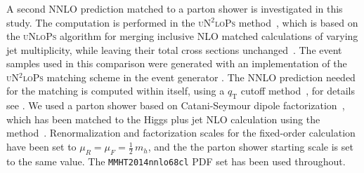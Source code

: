 \subsubsection{\hjetscompSherpa \hjetscompNNLOPS}
\label{sec:hjetscomp:tools:nnlops:sherpa}

A second NNLO prediction matched to a parton shower is investigated 
in this study. The computation is performed in the \textsc{uN$^2$loPs} 
method~\cite{Hoeche:2014aia,Hoche:2014dla}, which is based on the 
\textsc{uNloPs} algorithm for merging inclusive NLO matched calculations 
of varying jet multiplicity, while leaving their total cross sections 
unchanged~\cite{Lonnblad:2012ix,Lonnblad:2012ng}. The event samples 
used in this comparison were generated with an implementation of the 
\textsc{uN$^2$loPs} matching scheme in the event generator \hjetscompSherpa. The 
NNLO prediction needed for the matching is computed within \hjetscompSherpa itself, 
using a $q_\text{T}$ cutoff method~\cite{Gao:2012ja}, for details see 
\cite{Hoeche:2014aia,Hoche:2014dla}. We used a parton shower based 
on Catani-Seymour dipole factorization~\cite{Schumann:2007mg,Hoeche:2009xc},
which has been matched to the Higgs plus jet NLO calculation using 
the \hjetscompSMCatNLO method~\cite{Hoeche:2011fd,Hoeche:2012ft}. Renormalization 
and factorization scales for the fixed-order calculation have been 
set to $\mu_R = \mu_F = \tfrac{1}{2}\,m_h$, and the the parton shower 
starting scale is set to the same value. The \texttt{MMHT2014nnlo68cl} 
PDF set \cite{Harland-Lang:2014zoa} has been used throughout.

